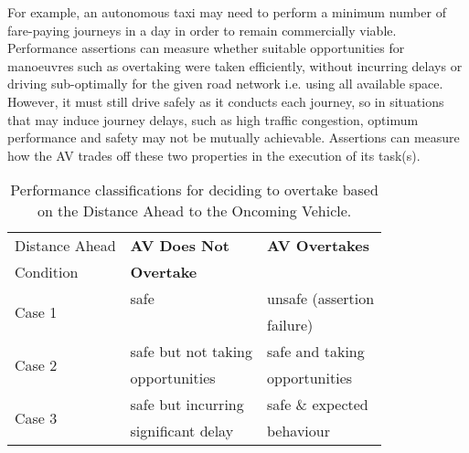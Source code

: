 For example, an autonomous taxi may need to perform a minimum number of fare-paying journeys in a day in order to remain commercially viable. Performance assertions can measure whether suitable opportunities for manoeuvres such as overtaking were taken efficiently, without incurring delays or driving sub-optimally for the given road network i.e. using all available space. However, it must still drive safely as it conducts each journey, so in situations that may induce journey delays, such as high traffic congestion, optimum performance and safety may not be mutually achievable. Assertions can measure how the AV trades off these two properties in the execution of its task(s).

\begin{table}[]
\centering
\begin{tabular}{|p{2.3cm}|p{2.3cm}|p{2.3cm}|}
\hline
\multicolumn{1}{|l|}{Distance Ahead} & \multicolumn{1}{l|}{\textbf{AV Does Not }} & \multicolumn{1}{l|}{\textbf{AV Overtakes}} \\ 
Condition & \textbf{Overtake} & \\
\hline
\multirow{2}{*}{Case 1} & safe & unsafe (assertion \\
& & failure) \\
\hline
\multirow{2}{*}{Case 2} & safe but not taking & safe and taking\\ 
& opportunities & opportunities\\
\hline
\multirow{2}{*}{Case 3} & safe but incurring  & safe \& expected  \\ 
& significant delay & behaviour\\
\hline
\end{tabular}
\caption{Performance classifications for deciding to overtake based on the Distance Ahead to the Oncoming Vehicle.}
\label{performance_metric_table}
\end{table}

